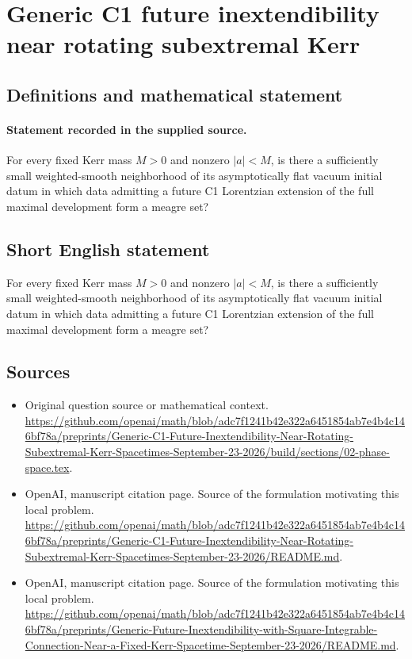 \documentclass[11pt]{article}
\begin{document}
\section*{Generic C1 future inextendibility near rotating subextremal Kerr}\label{30007236}
\subsection{Definitions and mathematical statement}
\paragraph{Statement recorded in the supplied source.}
For every fixed Kerr mass $M>0$ and nonzero $|a|<M$, is there a sufficiently small weighted-smooth neighborhood of its asymptotically flat vacuum initial datum in which data admitting a future C1 Lorentzian extension of the full maximal development form a meagre set?
\subsection{Short English statement}
For every fixed Kerr mass $M>0$ and nonzero $|a|<M$, is there a sufficiently small weighted-smooth neighborhood of its asymptotically flat vacuum initial datum in which data admitting a future C1 Lorentzian extension of the full maximal development form a meagre set?
\subsection{Sources}
\begin{itemize}
\item[S1] Original question source or mathematical context.
\url{https://github.com/openai/math/blob/adc7f1241b42e322a6451854ab7e4b4c146bf78a/preprints/Generic-C1-Future-Inextendibility-Near-Rotating-Subextremal-Kerr-Spacetimes-September-23-2026/build/sections/02-phase-space.tex}.
\item[S2] OpenAI, manuscript citation page. Source of the formulation motivating this local problem.
\url{https://github.com/openai/math/blob/adc7f1241b42e322a6451854ab7e4b4c146bf78a/preprints/Generic-C1-Future-Inextendibility-Near-Rotating-Subextremal-Kerr-Spacetimes-September-23-2026/README.md}.
\item[S3] OpenAI, manuscript citation page. Source of the formulation motivating this local problem.
\url{https://github.com/openai/math/blob/adc7f1241b42e322a6451854ab7e4b4c146bf78a/preprints/Generic-Future-Inextendibility-with-Square-Integrable-Connection-Near-a-Fixed-Kerr-Spacetime-September-23-2026/README.md}.
\end{itemize}
\end{document}
